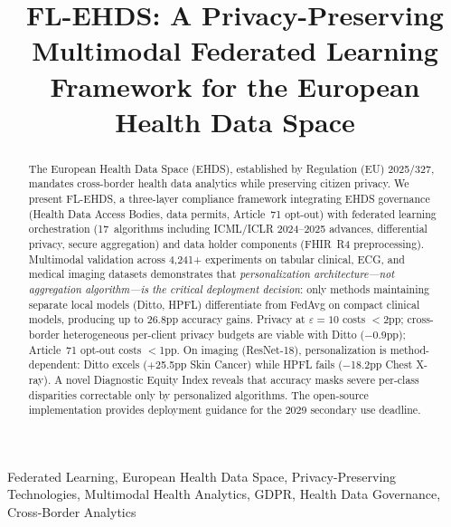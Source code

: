 \documentclass[conference,letterpaper]{IEEEtran}
\begin{document}
\title{FL-EHDS: A Privacy-Preserving Multimodal Federated Learning Framework for the European Health Data Space}

\author{
}

\maketitle

\begin{abstract}
The European Health Data Space (EHDS), established by Regulation (EU) 2025/327, mandates cross-border health data analytics while preserving citizen privacy. We present FL-EHDS, a three-layer compliance framework integrating EHDS governance (Health Data Access Bodies, data permits, Article~71 opt-out) with federated learning orchestration (17~algorithms including ICML/ICLR 2024--2025 advances, differential privacy, secure aggregation) and data holder components (FHIR~R4 preprocessing). Multimodal validation across 4,241+ experiments on tabular clinical, ECG, and medical imaging datasets demonstrates that \textit{personalization architecture---not aggregation algorithm---is the critical deployment decision}: only methods maintaining separate local models (Ditto, HPFL) differentiate from FedAvg on compact clinical models, producing up to 26.8pp accuracy gains. Privacy at $\varepsilon{=}10$ costs $<$2pp; cross-border heterogeneous per-client privacy budgets are viable with Ditto ($-$0.9pp); Article~71 opt-out costs $<$1pp. On imaging (ResNet-18), personalization is method-dependent: Ditto excels ($+$25.5pp Skin Cancer) while HPFL fails ($-$18.2pp Chest X-ray). A novel Diagnostic Equity Index reveals that accuracy masks severe per-class disparities correctable only by personalized algorithms. The open-source implementation provides deployment guidance for the 2029 secondary use deadline.
\end{abstract}

\begin{IEEEkeywords}
Federated Learning, European Health Data Space, Privacy-Preserving Technologies, Multimodal Health Analytics, GDPR, Health Data Governance, Cross-Border Analytics
\end{IEEEkeywords}
\end{document}
